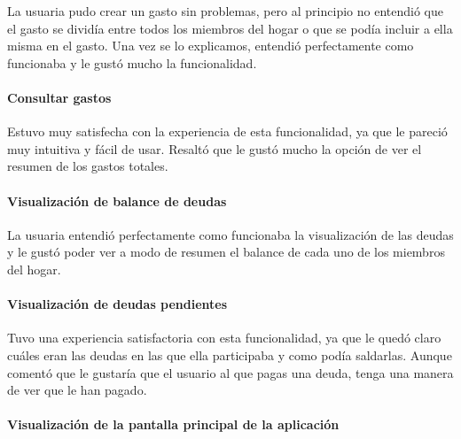 La usuaria pudo crear un gasto sin problemas, pero al principio no entendió que el gasto se dividía entre todos los miembros del hogar o que se podía incluir a ella misma en el gasto. 
Una vez se lo explicamos, entendió perfectamente como funcionaba y le gustó mucho la funcionalidad.

\paragraph{Consultar gastos}
\parbox{\textwidth}{ 
   
}

Estuvo muy satisfecha con la experiencia de esta funcionalidad, ya que le pareció muy intuitiva y fácil de usar. Resaltó que le gustó mucho 
la opción de ver el resumen de los gastos totales. 

\paragraph{Visualización de balance de deudas}
\parbox{\textwidth}{ 
   
}

La usuaria entendió perfectamente como funcionaba la visualización de las deudas y le gustó poder ver a modo de resumen el balance de cada uno de los miembros del hogar.

\paragraph{Visualización de deudas pendientes}
\parbox{\textwidth}{ 
   
}

Tuvo una experiencia satisfactoria con esta funcionalidad, ya que le quedó claro cuáles eran las deudas en las que ella participaba y como podía saldarlas. 
Aunque comentó que le gustaría que el usuario al que pagas una deuda, tenga una manera de ver que le han pagado.


\paragraph{Visualización de la pantalla principal de la aplicación}

\parbox{\textwidth}{ 
   
}

